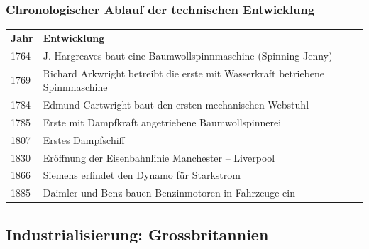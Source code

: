 \documentclass[10pt, openright=true]{scrartcl}
\begin{document}
\subsubsection{Chronologischer Ablauf der technischen Entwicklung}
\begin{tabularx}{1\textwidth}{L{3cm}  X}
 \textbf{Jahr} & \textbf{Entwicklung} \\ 
1764 & J. Hargreaves baut eine Baumwollspinnmaschine (Spinning Jenny)\\
 1769 & Richard Arkwright betreibt die erste mit Wasserkraft betriebene Spinnmaschine \\
1784 & Edmund Cartwright baut den ersten mechanischen Webstuhl\\
 1785 & Erste mit Dampfkraft angetriebene Baumwollspinnerei\\
1807 & Erstes Dampfschiff\\
 1830 & Eröffnung der Eisenbahnlinie Manchester – Liverpool\\
1866 & Siemens erfindet den Dynamo für Starkstrom\\
 1885 & Daimler und Benz bauen Benzinmotoren in Fahrzeuge ein\\
\end{tabularx}
\subsection{Industrialisierung: Grossbritannien}
\end{document}
